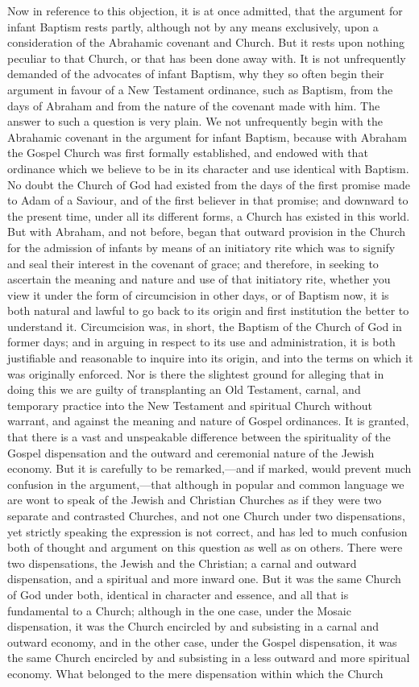 \documentclass[
]{book}
\begin{document}
Now in reference to this objection, it is at once admitted, that the argument for infant Baptism rests partly, although not by any means exclusively, upon a consideration of the Abrahamic covenant and Church. But it rests upon nothing peculiar to that Church, or that has been done away with. It is not unfrequently demanded of the advocates of infant Baptism, why they so often begin their argument in favour of a New Testament ordinance, such as Baptism, from the days of Abraham and from the nature of the covenant made with him. The answer to such a question is very plain. We not unfrequently begin with the Abrahamic covenant in the argument for infant Baptism, because with Abraham the Gospel Church was first formally established, and endowed with that ordinance which we believe to be in its character and use identical with Baptism. No doubt the Church of God had existed from the days of the first promise made to Adam of a Saviour, and of the first believer in that promise; and downward to the present time, under all its different forms, a Church has existed in this world. But with Abraham, and not before, began that outward provision in the Church for the admission of infants by means of an initiatory rite which was to signify and seal their interest in the covenant of grace; and therefore, in seeking to ascertain the meaning and nature and use of that initiatory rite, whether you view it under the form of circumcision in other days, or of Baptism now, it is both natural and lawful to go back to its origin and first institution the better to understand it. Circumcision was, in short, the Baptism of the Church of God in former days; and in arguing in respect to its use and administration, it is both justifiable and reasonable to inquire into its origin, and into the terms on which it was originally enforced. Nor is there the slightest ground for alleging that in doing this we are guilty of transplanting an Old Testament, carnal, and temporary practice into the New Testament and spiritual Church without warrant, and against the meaning and nature of Gospel ordinances. It is granted, that there is a vast and unspeakable difference between the spirituality of the Gospel dispensation and the outward and ceremonial nature of the Jewish economy. But it is carefully to be remarked,---and if marked, would prevent much confusion in the argument,---that although in popular and common language we are wont to speak of the Jewish and Christian Churches as if they were two separate and contrasted Churches, and not one Church under two dispensations, yet strictly speaking the expression is not correct, and has led to much confusion both of thought and argument on this question as well as on others. There were two dispensations, the Jewish and the Christian; a carnal and outward dispensation, and a spiritual and more inward one. But it was the same Church of God under both, identical in character and essence, and all that is fundamental to a Church; although in the one case, under the Mosaic dispensation, it was the Church encircled by and subsisting in a carnal and outward economy, and in the other case, under the Gospel dispensation, it was the same Church encircled by and subsisting in a less outward and more spiritual economy. What belonged to the mere dispensation within which the Church 
\end{document}
